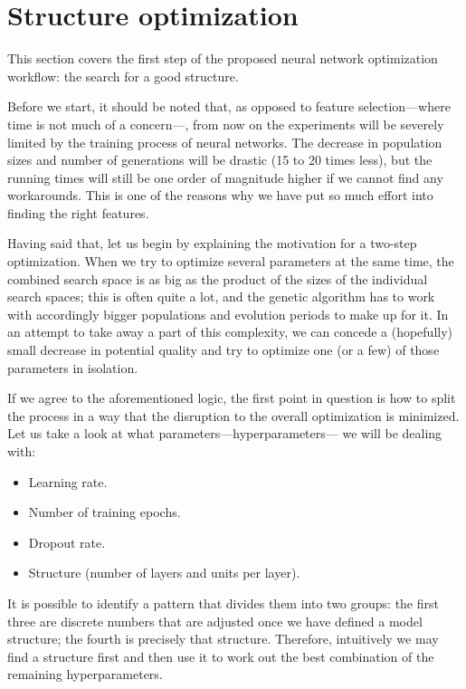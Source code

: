 \newpage

\section{Structure optimization}\label{sec:res_so}

	This section covers the first step of the proposed neural network optimization workflow: the search for a good structure.

	Before we start, it should be noted that, as opposed to feature selection---where time is not much of a concern---, from now on the experiments will be severely limited by the training process of neural networks. The decrease in population sizes and number of generations will be drastic (15 to 20 times less), but the running times will still be one order of magnitude higher if we cannot find any workarounds. This is one of the reasons why we have put so much effort into finding the right features.

	Having said that, let us begin by explaining the motivation for a two-step optimization. When we try to optimize several parameters at the same time, the combined search space is as big as the product of the sizes of the individual search spaces; this is often quite a lot, and the genetic algorithm has to work with accordingly bigger populations and evolution periods to make up for it. In an attempt to take away a part of this complexity, we can concede a (hopefully) small decrease in potential quality and try to optimize one (or a few) of those parameters in isolation.

	If we agree to the aforementioned logic, the first point in question is how to split the process in a way that the disruption to the overall optimization is minimized. Let us take a look at what parameters---hyperparameters--- we will be dealing with:

	\begin{itemize}

		\item
		Learning rate.

		\item
		Number of training epochs.

		\item
		Dropout rate.

		\item
		Structure (number of layers and units per layer).

	\end{itemize}

	It is possible to identify a pattern that divides them into two groups: the first three are discrete numbers that are adjusted once we have defined a model structure; the fourth is precisely that structure. Therefore, intuitively we may find a structure first and then use it to work out the best combination of the remaining hyperparameters.

